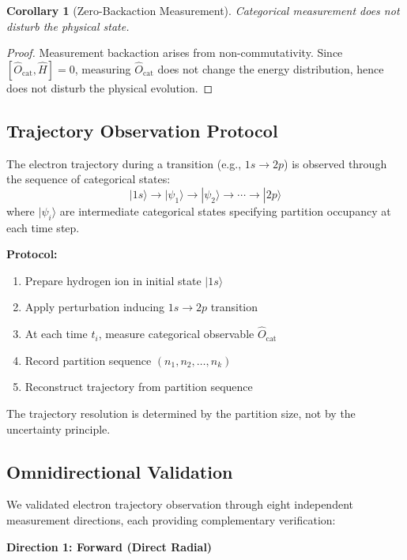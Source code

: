 \documentclass[aps,prl,twocolumn,superscriptaddress,floatfix]{revtex4-2}
\newtheorem{corollary}[theorem]{Corollary}
\begin{document}
\begin{corollary}[Zero-Backaction Measurement]
Categorical measurement does not disturb the physical state.
\end{corollary}

\begin{proof}
Measurement backaction arises from non-commutativity. Since $[\hat{O}_{\text{cat}}, \hat{H}] = 0$, measuring $\hat{O}_{\text{cat}}$ does not change the energy distribution, hence does not disturb the physical evolution.
\end{proof}

\subsection{Trajectory Observation Protocol}

The electron trajectory during a transition (e.g., $1s \to 2p$) is observed through the sequence of categorical states:
\begin{equation}
|1s\rangle \to |\psi_1\rangle \to |\psi_2\rangle \to \cdots \to |2p\rangle
\end{equation}
where $|\psi_i\rangle$ are intermediate categorical states specifying partition occupancy at each time step.

\textbf{Protocol:}
\begin{enumerate}
\item Prepare hydrogen ion in initial state $|1s\rangle$
\item Apply perturbation inducing $1s \to 2p$ transition
\item At each time $t_i$, measure categorical observable $\hat{O}_{\text{cat}}$
\item Record partition sequence $(n_1, n_2, \ldots, n_k)$
\item Reconstruct trajectory from partition sequence
\end{enumerate}

The trajectory resolution is determined by the partition size, not by the uncertainty principle.

\subsection{Omnidirectional Validation}

We validated electron trajectory observation through eight independent measurement directions, each providing complementary verification:

\textbf{Direction 1: Forward (Direct Radial)}
\end{document}

